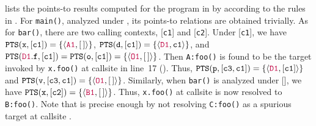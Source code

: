  lists the  points-to results computed for the program in  by  according to the rules in .  For \texttt{main()}, analyzed under   \emptyctx,  its points-to relations are obtained trivially. As for \texttt{bar()}, there are  two  calling contexts, [\texttt{c1}] and [\texttt{c2}]. Under [\texttt{c1}], we have $\texttt{PTS}(\mathtt{x}, [\mathtt{c1}]) = \{\langle {\color{purple} \mathtt{A1}}, [\,]\rangle\}$, $\texttt{PTS}(\mathtt{d}, [\mathtt{c1}]) = \{\langle {\color{purple} \mathtt{D1}}, \mathtt{c1}\rangle\}$, and 
$\texttt{PTS}({\color{purple}\mathtt{D1}}.\mathtt{f}, [\mathtt{c1}]) = \texttt{PTS}(\mathtt{o}, [\mathtt{c1}]) = \{\langle {\color{purple} \mathtt{O1}}, [\,]\rangle\}$. 
Then \texttt{A:foo()} is found to be  the target invoked by \texttt{x.foo()} at callsite  in line~17 (). 
Thus, $\texttt{PTS}(\mathtt{p}, [\mathtt{c3}, \mathtt{c1}]) = \{\langle {\color{purple} \mathtt{D1}}, [\mathtt{c1}]\rangle\}$ and $\texttt{PTS}(\mathtt{v}, [\mathtt{c3}, \mathtt{c1}]) = \{\langle {\color{purple} \mathtt{O1}}, [\,]\rangle\}$.
Similarly, when \texttt{bar()} is analyzed under [], we have $\texttt{PTS}(\mathtt{x}, [\mathtt{c2}]) = \{\langle {\color{purple} \mathtt{B1}}, [\,]\rangle\}$. Thus, \texttt{x.foo()}  at callsite  is now resolved to \texttt{B:foo()}. Note that  is precise enough by not
resolving \texttt{C:foo()}  
as a spurious target   at callsite .

